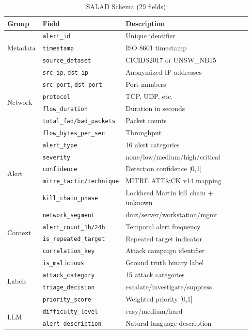 \documentclass[review]{elsarticle}
\begin{document}
\begin{table}[h]
\centering
\small
\caption{SALAD Schema (29 fields)}
\label{tab:schema}
\begin{tabular}{llp{6cm}}
\toprule
\textbf{Group} & \textbf{Field} & \textbf{Description} \\
\midrule
\multirow{3}{*}{Metadata} & \texttt{alert\_id} & Unique identifier \\
 & \texttt{timestamp} & ISO 8601 timestamp \\
 & \texttt{source\_dataset} & CICIDS2017 or UNSW\_NB15 \\
\midrule
\multirow{6}{*}{Network} & \texttt{src\_ip}, \texttt{dst\_ip} & Anonymized IP addresses \\
 & \texttt{src\_port}, \texttt{dst\_port} & Port numbers \\
 & \texttt{protocol} & TCP, UDP, etc. \\
 & \texttt{flow\_duration} & Duration in seconds \\
 & \texttt{total\_fwd/bwd\_packets} & Packet counts \\
 & \texttt{flow\_bytes\_per\_sec} & Throughput \\
\midrule
\multirow{5}{*}{Alert} & \texttt{alert\_type} & 16 alert categories \\
 & \texttt{severity} & none/low/medium/high/critical \\
 & \texttt{confidence} & Detection confidence [0,1] \\
 & \texttt{mitre\_tactic/technique} & MITRE ATT\&CK v14 mapping~\cite{strom2018mitre} \\
 & \texttt{kill\_chain\_phase} & Lockheed Martin kill chain + unknown~\cite{hutchins2011killchain} \\
\midrule
\multirow{4}{*}{Context} & \texttt{network\_segment} & dmz/server/workstation/mgmt \\
 & \texttt{alert\_count\_1h/24h} & Temporal alert frequency \\
 & \texttt{is\_repeated\_target} & Repeated target indicator \\
 & \texttt{correlation\_key} & Attack campaign identifier \\
\midrule
\multirow{4}{*}{Labels} & \texttt{is\_malicious} & Ground truth binary label \\
 & \texttt{attack\_category} & 15 attack categories \\
 & \texttt{triage\_decision} & escalate/investigate/suppress \\
 & \texttt{priority\_score} & Weighted priority [0,1] \\
\midrule
\multirow{2}{*}{LLM} & \texttt{difficulty\_level} & easy/medium/hard \\
 & \texttt{alert\_description} & Natural language description \\
\bottomrule
\end{tabular}
\end{table}
\end{document}
